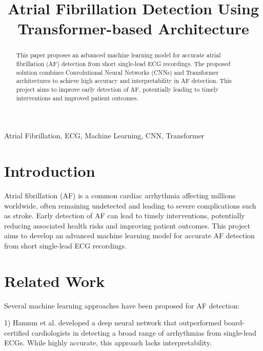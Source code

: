 \documentclass[conference]{IEEEtran}
\begin{document}
\title{Atrial Fibrillation Detection Using Transformer-based Architecture}

\author{
}

\maketitle

\begin{abstract}
    This paper proposes an advanced machine learning model for accurate atrial fibrillation (AF) detection from short single-lead ECG recordings. The proposed solution combines Convolutional Neural Networks (CNNs) and Transformer architectures to achieve high accuracy and interpretability in AF detection. This project aims to improve early detection of AF, potentially leading to timely interventions and improved patient outcomes.
\end{abstract}

\begin{IEEEkeywords}
    Atrial Fibrillation, ECG, Machine Learning, CNN, Transformer
\end{IEEEkeywords}

\section{Introduction}
Atrial fibrillation (AF) is a common cardiac arrhythmia affecting millions worldwide, often remaining undetected and leading to severe complications such as stroke. Early detection of AF can lead to timely interventions, potentially reducing associated health risks and improving patient outcomes. This project aims to develop an advanced machine learning model for accurate AF detection from short single-lead ECG recordings.

\section{Related Work}
Several machine learning approaches have been proposed for AF detection:

1) Hannun et al. \cite{hannun} developed a deep neural network that outperformed board-certified cardiologists in detecting a broad range of arrhythmias from single-lead ECGs. While highly accurate, this approach lacks interpretability.
\end{document}
